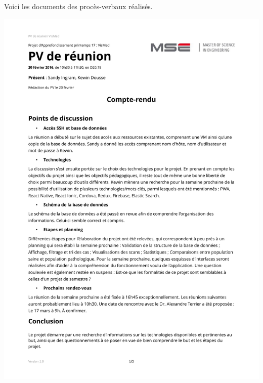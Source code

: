 Voici les documents des procès-verbaux réalisés.

\newpage

\includegraphics[width=1\textwidth]{images/annexes/pvs/VisMed_PV_20_02_2017}

